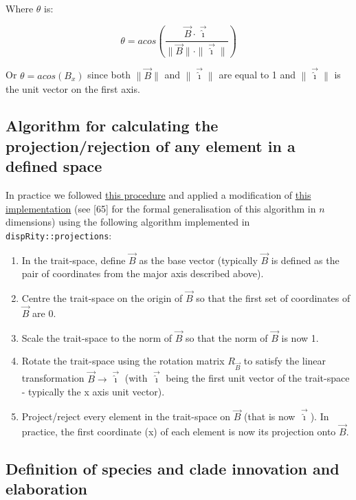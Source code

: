 \documentclass[12pt,a4paper]{article}
\begin{document}
Where $\theta$ is:

\begin{equation}
    \theta = acos \left(\frac{\vec{B} \cdot \vec{\hat{\imath}}}{\|\vec{B}\| \cdot \|\vec{\hat{\imath}}\|} \right)
\end{equation}

Or $\theta = acos (B_x)$ since both $\|\vec{B}\|$ and $\|\vec{\hat{\imath}}\|$ are equal to 1 and $\|\vec{\hat{\imath}}\|$ is the unit vector on the first axis.

\subsection{Algorithm for calculating the projection/rejection of any element in a defined space}

In practice we followed \href{https://math.stackexchange.com/questions/598750/finding-the-rotation-matrix-in-n-dimensions}{this procedure} and applied a modification of \href{https://stackoverflow.com/questions/42520301/find-rotation-matrix-of-one-vector-to-another-using-r/42542385#42542385}{this implementation} (see [65]%
 for the formal generalisation of this algorithm in $n$ dimensions) using the following algorithm implemented in \texttt{dispRity::projections}:

\begin{enumerate}
 \item In the trait-space, define $\vec{B}$ as the base vector (typically $\vec{B}$ is defined as the pair of coordinates from the major axis described above).
 \item Centre the trait-space on the origin of $\vec{B}$ so that the first set of coordinates of $\vec{B}$ are 0.
 \item Scale the trait-space to the norm of $\vec{B}$ so that the norm of $\vec{B}$ is now 1.
 \item Rotate the trait-space using the rotation matrix $R_{\vec{B}}$ to satisfy the linear transformation $\vec{B} \rightarrow \vec{\hat{\imath}}$ (with $\vec{\hat{\imath}}$ being the first unit vector of the trait-space - typically the x axis unit vector). 
 \item Project/reject every element in the trait-space on $\vec{B}$ (that is now $\vec{\hat{\imath}}$). In practice, the first coordinate (x) of each element is now its projection onto $\vec{B}$.
\end{enumerate}


\subsection{Definition of species and clade innovation and elaboration}
\end{document}
